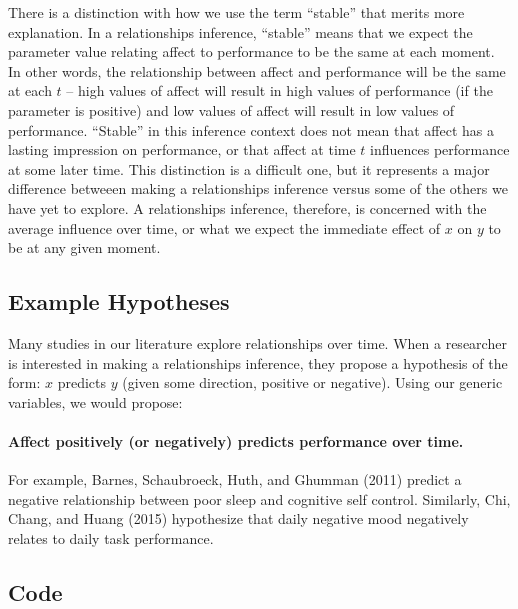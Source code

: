 \documentclass[english,,man]{apa6}
\let\oldparagraph\paragraph
\renewcommand{\paragraph}[1]{\oldparagraph{#1}\mbox{}}
\theoremstyle{definition}
\theoremstyle{definition}
\theoremstyle{definition}
\theoremstyle{remark}
\begin{document}
There is a distinction with how we use the term \enquote{stable} that
merits more explanation. In a relationships inference, \enquote{stable}
means that we expect the parameter value relating affect to performance
to be the same at each moment. In other words, the relationship between
affect and performance will be the same at each \(t\) -- high values of
affect will result in high values of performance (if the parameter is
positive) and low values of affect will result in low values of
performance. \enquote{Stable} in this inference context does not mean
that affect has a lasting impression on performance, or that affect at
time \(t\) influences performance at some later time. This distinction
is a difficult one, but it represents a major difference betweeen making
a relationships inference versus some of the others we have yet to
explore. A relationships inference, therefore, is concerned with the
average influence over time, or what we expect the immediate effect of
\(x\) on \(y\) to be at any given moment.

\hypertarget{example-hypotheses}{%
\subsection{Example Hypotheses}\label{example-hypotheses}}

Many studies in our literature explore relationships over time. When a
researcher is interested in making a relationships inference, they
propose a hypothesis of the form: \(x\) predicts \(y\) (given some
direction, positive or negative). Using our generic variables, we would
propose:

\hypertarget{affect-positively-or-negatively-predicts-performance-over-time.}{%
\paragraph{Affect positively (or negatively) predicts performance over
time.}\label{affect-positively-or-negatively-predicts-performance-over-time.}}

\noindent For example, Barnes, Schaubroeck, Huth, and Ghumman (2011)
predict a negative relationship between poor sleep and cognitive self
control. Similarly, Chi, Chang, and Huang (2015) hypothesize that daily
negative mood negatively relates to daily task performance.

\hypertarget{code}{%
\subsection{Code}\label{code}}
\end{document}
